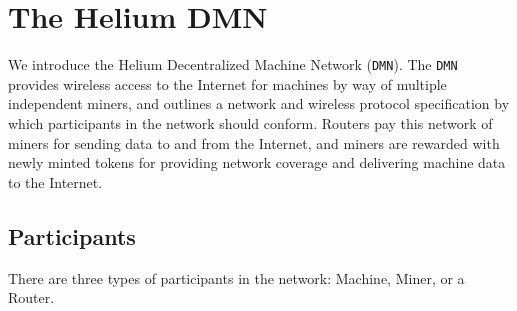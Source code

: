 \documentclass[10pt, nonatbib, nocopyrightspace, reprint]{sigplanconf}
\begin{document}
\section{The Helium DMN}

We introduce the Helium Decentralized Machine Network (\verb|DMN|). The \verb|DMN| provides wireless access to the Internet for machines by way of multiple independent miners, and outlines a network and wireless protocol specification by which participants in the network should conform. Routers pay this network of miners for sending data to and from the Internet, and miners are rewarded with newly minted tokens for providing network coverage and delivering machine data to the Internet.

\subsection{Participants}

There are three types of participants in the network: Machine, Miner, or a Router.
\end{document}

